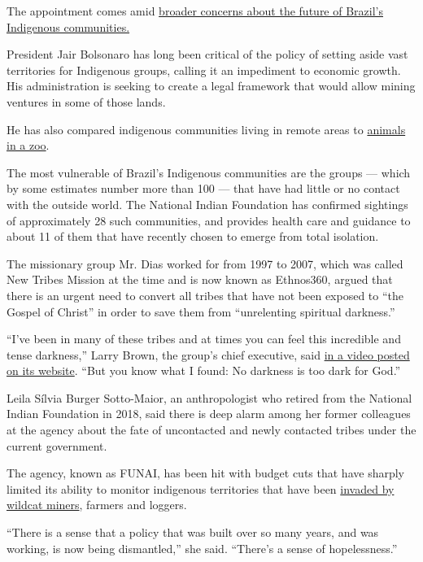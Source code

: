 The appointment comes amid
\href{https://www.nytimes3xbfgragh.onion/2019/01/02/world/americas/brazil-bolsonaro-president-indigenous-lands.html}{broader
concerns about the future of Brazil's Indigenous communities.}

President Jair Bolsonaro has long been critical of the policy of setting
aside vast territories for Indigenous groups, calling it an impediment
to economic growth. His administration is seeking to create a legal
framework that would allow mining ventures in some of those lands.

He has also compared indigenous communities living in remote areas to
\href{https://oglobo.globo.com/sociedade/bolsonaro-compara-indios-em-reservas-animais-em-zoologicos-23272902}{animals
in a zoo}.

The most vulnerable of Brazil's Indigenous communities are the groups
--- which by some estimates number more than 100 --- that have had
little or no contact with the outside world. The National Indian
Foundation has confirmed sightings of approximately 28 such communities,
and provides health care and guidance to about 11 of them that have
recently chosen to emerge from total isolation.

The missionary group Mr. Dias worked for from 1997 to 2007, which was
called New Tribes Mission at the time and is now known as Ethnos360,
argued that there is an urgent need to convert all tribes that have not
been exposed to ``the Gospel of Christ'' in order to save them from
``unrelenting spiritual darkness.''

``I've been in many of these tribes and at times you can feel this
incredible and tense darkness,'' Larry Brown, the group's chief
executive, said \href{https://ethnos360.org/about}{in a video posted on
its website}. ``But you know what I found: No darkness is too dark for
God.''

Leila Sílvia Burger Sotto-Maior, an anthropologist who retired from the
National Indian Foundation in 2018, said there is deep alarm among her
former colleagues at the agency about the fate of uncontacted and newly
contacted tribes under the current government.

The agency, known as FUNAI, has been hit with budget cuts that have
sharply limited its ability to monitor indigenous territories that have
been
\href{https://www.nytimes3xbfgragh.onion/2018/11/10/world/americas/brazil-indigenous-mining-bolsonaro.html}{invaded
by wildcat miners}, farmers and loggers.

``There is a sense that a policy that was built over so many years, and
was working, is now being dismantled,'' she said. ``There's a sense of
hopelessness.''

